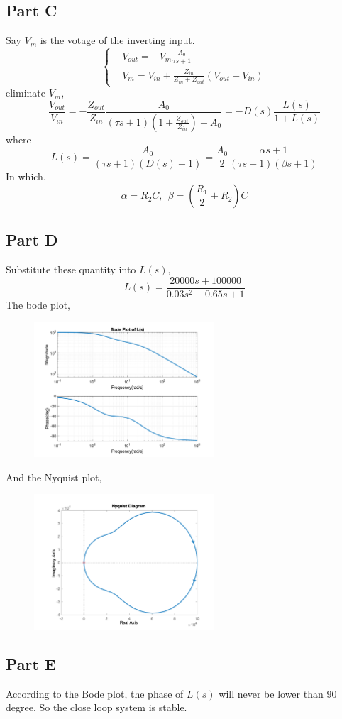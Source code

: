 \documentclass[a4paper]{article}
\begin{document}
\subsection{Part C}
Say $V_m$ is the votage of the inverting input.
\begin{equation*} 
\left\{
\begin{aligned}
& V_{out} = -V_m\frac{A_0}{\tau s +1} \\
& V_m = V_{in} + \frac{Z_{in}}{Z_{in}+Z_{out}}(V_{out}-V_{in})
\end{aligned}
\right.
\end{equation*}
eliminate $V_m$, 
$$
\frac{V_{out}}{V_{in}} = -\frac{Z_{out}}{Z_{in}}\frac{A_0}{(\tau s +1 )(1 + \frac{Z_{out}}{Z_{in}})+ A_0} = -D(s)\frac{L(s)}{1+L(s)}
$$
where
$$
L(s) = \frac{A_0}{(\tau s + 1)(D(s)+1)} =  \frac{A_0}{2}\frac{\alpha s +1 }{(\tau s + 1)(\beta s+1)}
$$
In which,
$$
\alpha = R_2C, \ \ \beta = (\frac{R_1}{2}+R_2)C
$$
\subsection{Part D}
Substitute these quantity into $L(s)$,
$$
L(s) = \frac{20000 s + 100000}{0.03 s^2 + 0.65 s + 1}
$$
The bode plot,
\begin{figure}[H]
\centering
\includegraphics[width = 0.6\textwidth]{pic/1.png}
\end{figure}
\noindent And the Nyquist plot,
\begin{figure}[H]
\centering
\includegraphics[width = 0.6\textwidth]{pic/2.png}
\end{figure}

\subsection{Part E}
According to the Bode plot, the phase of $L(s)$ will never be lower than 90 degree. So the close loop system is stable.
\end{document}
